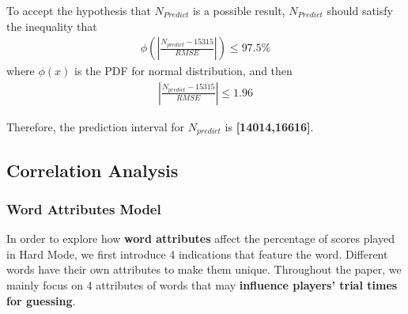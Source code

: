 To accept the hypothesis that $N_{Predict}$ is a possible result, $N_{Predict}$ should satisfy the inequality that
\begin{align}
    \phi(|\frac{N_{predict}-15315}{RMSE}|)\leq 97.5\%
\end{align}
where $\phi(x)$ is the PDF for normal distribution, and then
\begin{align}
    |\frac{N_{predict}-15315}{RMSE}|\leq 1.96
\end{align}

Therefore, the prediction interval for $N_{predict}$ is \textbf{[14014,16616]}.

\subsection{Correlation Analysis}
\subsubsection{Word Attributes Model}
In order to explore how \textbf{word attributes} affect the percentage of scores 
played in Hard Mode, we first introduce 4 indications that feature the word. Different words have their own attributes to make them unique. Throughout the paper, we mainly focus on 4 attributes of words that may \textbf{influence players' trial times for guessing}.

